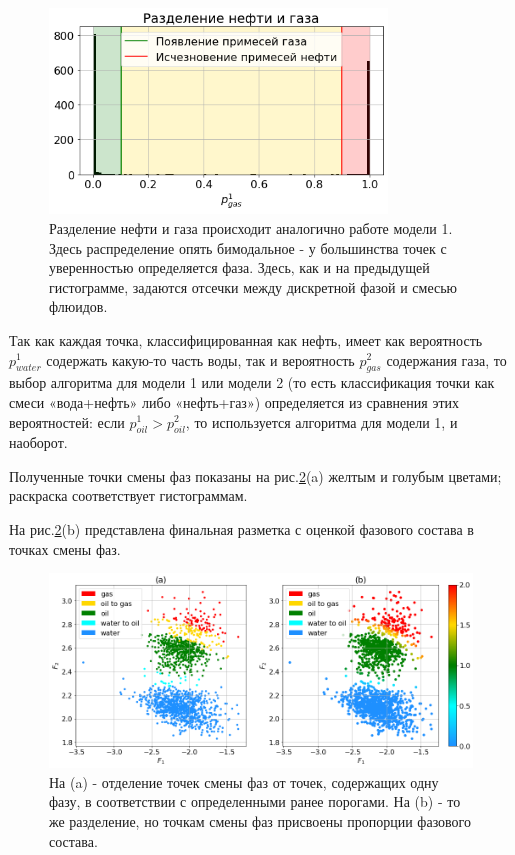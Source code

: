 \begin{figure}[H]
\centering
\includegraphics[width=0.8\textwidth]{TA/histogram_2.png}
\caption{Разделение нефти и газа происходит аналогично работе модели 1. Здесь распределение опять бимодальное - у большинства точек с уверенностью определяется фаза. Здесь, как и на предыдущей гистограмме, задаются отсечки между дискретной фазой и смесью флюидов.}
\label{fig:histogram_2}
\end{figure}

\par
Так как каждая точка, классифицированная как нефть, имеет как вероятность $p_{water}^1$ содержать какую-то часть воды, так и вероятность $p_{gas}^2$ содержания газа, то выбор алгоритма для модели 1 или модели 2 (то есть классификация точки как смеси «вода+нефть» либо «нефть+газ») определяется из сравнения этих вероятностей: если $p_{oil}^1>p_{oil}^2$, то используется алгоритма для модели 1, и наоборот.
\par
Полученные точки смены фаз показаны на рис.\ref{fig:sensor_1_final}(a) желтым и голубым цветами; раскраска соответствует гистограммам.
\par
На рис.\ref{fig:sensor_1_final}(b) представлена финальная разметка с оценкой фазового состава в точках смены фаз.

\begin{figure}[H]
\centering
\includegraphics[width=1.0\textwidth]{TA/sensor_1_final.png}
\caption{На (a) - отделение точек смены фаз от точек, содержащих одну фазу, в соответствии с определенными ранее порогами. На (b) - то же разделение, но точкам смены фаз присвоены пропорции фазового состава.}
\label{fig:sensor_1_final}
\end{figure}